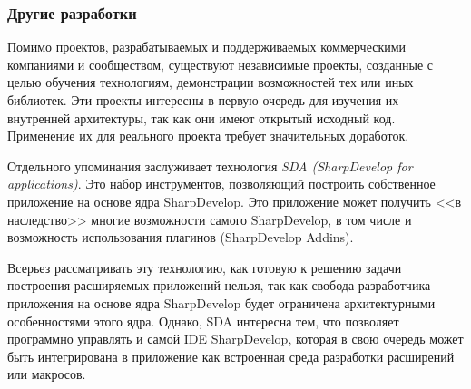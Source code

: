 \subsubsection{Другие разработки}

Помимо проектов, разрабатываемых и поддерживаемых коммерческими компаниями и сообществом, существуют независимые проекты, созданные с целью обучения технологиям, демонстрации возможностей тех или иных библиотек. Эти проекты интересны в первую очередь для изучения их внутренней архитектуры, так как они имеют открытый исходный код. Применение их для реального проекта требует значительных доработок.

Отдельного упоминания заслуживает технология {\it SDA (SharpDevelop  for applications)}. Это набор инструментов, позволяющий построить собственное приложение на основе ядра SharpDevelop. Это приложение может получить <<в наследство>> многие возможности самого SharpDevelop, в том числе и возможность использования плагинов (SharpDevelop Addins).

Всерьез рассматривать эту технологию, как готовую к решению задачи построения расширяемых приложений нельзя, так как свобода разработчика приложения на основе ядра SharpDevelop будет ограничена архитектурными особенностями этого ядра. Однако, SDA интересна тем, что позволяет программно управлять и самой IDE SharpDevelop, которая в свою очередь может быть интегрирована в приложение как встроенная среда разработки расширений или макросов.